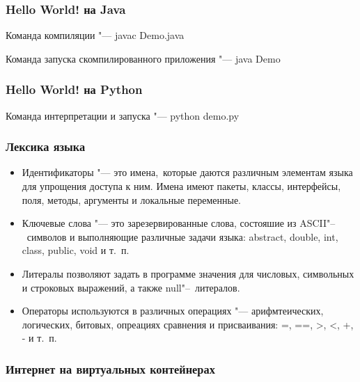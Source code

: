 \documentclass[default]{beamer}
\begin{document}
	\begin{frame}
		\frametitle{Hello World! на Java}
		\lstB
		
		\par\bigskip
		Команда компиляции "--- javac Demo.java
		
		Команда запуска скомпилированного приложения "--- java Demo
	\end{frame}


\begin{frame}
	\frametitle{Hello World! на Python}
	\lstBP
	
	\par\bigskip
	Команда интерпретации и запуска "--- python demo.py
\end{frame}
	
	\begin{frame}
	\frametitle{Лексика языка}
	
	\begin{itemize}
		\item Идентификаторы "--- это имена,~которые даются различным элементам языка
		для упрощения доступа к ним. Имена имеют пакеты, классы, интерфейсы, поля,
		методы, аргументы и локальные переменные.
		\item Ключевые слова "--- это зарезервированные слова, состояшие из
		ASCII"--~символов и выполняющие различные задачи языка: abstract, double, int,
		class, public, void и т.~п.
		\item Литералы позволяют задать в программе значения для числовых, символьных и строковых выражений, а также null"--~литералов.
		\item Операторы используются в различных операциях "--- арифмтеических, логических, битовых, опреациях сравнения и присваивания: =, ==, >, <, +, - и т.~п.
	\end{itemize}
	\end{frame}


	\begin{frame}
		\frametitle{Интернет на виртуальных контейнерах}
		\lstC
	
	\end{frame}
\end{document}
